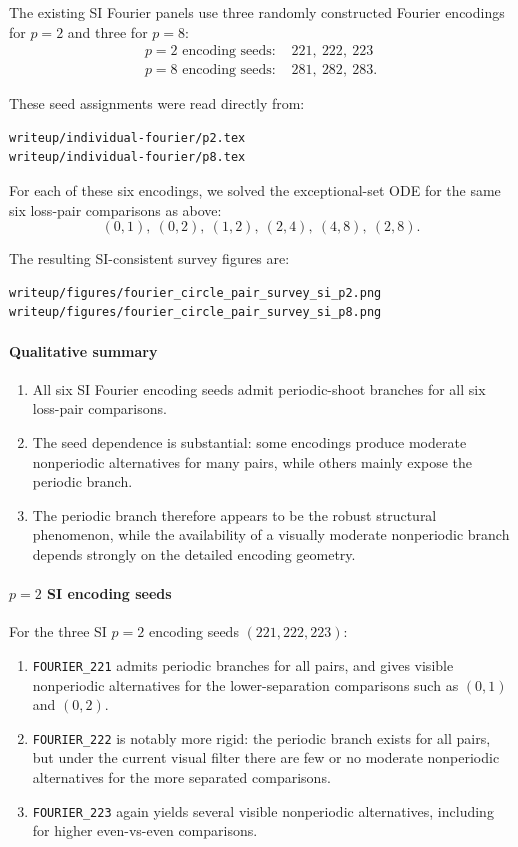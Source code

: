 \documentclass[11pt]{article}
\begin{document}
The existing SI Fourier panels use three randomly constructed Fourier encodings for $p=2$ and three for $p=8$:
\begin{align*}
\text{$p=2$ encoding seeds: } & 221,\ 222,\ 223 \\
\text{$p=8$ encoding seeds: } & 281,\ 282,\ 283.
\end{align*}

These seed assignments were read directly from:
\begin{Verbatim}[fontsize=\small]
writeup/individual-fourier/p2.tex
writeup/individual-fourier/p8.tex
\end{Verbatim}

For each of these six encodings, we solved the exceptional-set ODE for the same six loss-pair comparisons as above:
\[
(0,1),\ (0,2),\ (1,2),\ (2,4),\ (4,8),\ (2,8).
\]

The resulting SI-consistent survey figures are:
\begin{Verbatim}[fontsize=\small]
writeup/figures/fourier_circle_pair_survey_si_p2.png
writeup/figures/fourier_circle_pair_survey_si_p8.png
\end{Verbatim}

\paragraph*{Qualitative summary}
\begin{enumerate}
\item All six SI Fourier encoding seeds admit periodic-shoot branches for all six loss-pair comparisons.
\item The seed dependence is substantial: some encodings produce moderate nonperiodic alternatives for many pairs, while others mainly expose the periodic branch.
\item The periodic branch therefore appears to be the robust structural phenomenon, while the availability of a visually moderate nonperiodic branch depends strongly on the detailed encoding geometry.
\end{enumerate}

\paragraph*{$p=2$ SI encoding seeds}
For the three SI $p=2$ encoding seeds $(221,222,223)$:
\begin{enumerate}
\item \texttt{FOURIER\_221} admits periodic branches for all pairs, and gives visible nonperiodic alternatives for the lower-separation comparisons such as $(0,1)$ and $(0,2)$.
\item \texttt{FOURIER\_222} is notably more rigid: the periodic branch exists for all pairs, but under the current visual filter there are few or no moderate nonperiodic alternatives for the more separated comparisons.
\item \texttt{FOURIER\_223} again yields several visible nonperiodic alternatives, including for higher even-vs-even comparisons.
\end{enumerate}
\end{document}

